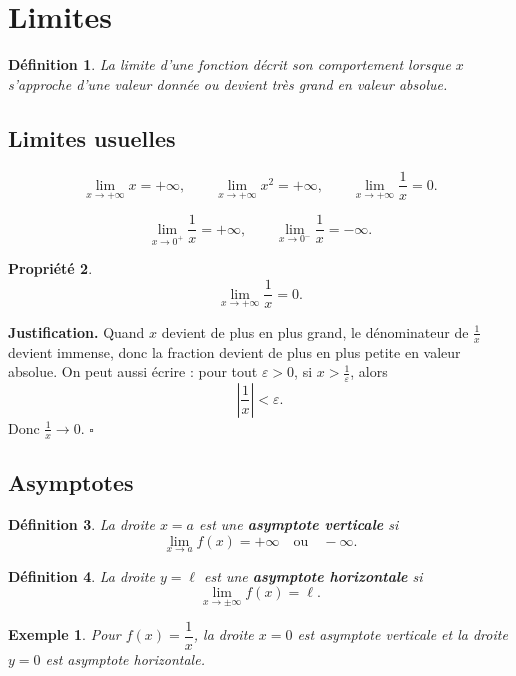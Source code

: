 \documentclass[11pt,a4paper]{article}
\newtheorem{definition}{Définition}[section]
\newtheorem{propriete}[definition]{Propriété}
\newtheorem*{exemple}{Exemple}
\begin{document}
\section{Limites}

\begin{definition}
La limite d'une fonction décrit son comportement lorsque \(x\) s'approche d'une valeur donnée ou devient très grand en valeur absolue.
\end{definition}

\subsection{Limites usuelles}

\[
\lim_{x\to +\infty}x=+\infty,\qquad
\lim_{x\to +\infty}x^2=+\infty,\qquad
\lim_{x\to +\infty}\frac1x=0.
\]

\[
\lim_{x\to 0^+}\frac1x=+\infty,\qquad
\lim_{x\to 0^-}\frac1x=-\infty.
\]

\begin{propriete}
\[
\lim_{x\to +\infty}\frac1x=0.
\]
\end{propriete}

\textbf{Justification.}  
Quand \(x\) devient de plus en plus grand, le dénominateur de \(\frac1x\) devient immense, donc la fraction devient de plus en plus petite en valeur absolue. On peut aussi écrire : pour tout \(\varepsilon>0\), si \(x>\frac1\varepsilon\), alors
\[
\left|\frac1x\right|<\varepsilon.
\]
Donc \(\frac1x\to 0\). \(\square\)

\subsection{Asymptotes}

\begin{definition}
La droite \(x=a\) est une \textbf{asymptote verticale} si
\[
\lim_{x\to a}f(x)=+\infty \quad \text{ou} \quad -\infty.
\]
\end{definition}

\begin{definition}
La droite \(y=\ell\) est une \textbf{asymptote horizontale} si
\[
\lim_{x\to \pm\infty}f(x)=\ell.
\]
\end{definition}

\begin{exemple}
Pour \(f(x)=\dfrac1x\), la droite \(x=0\) est asymptote verticale et la droite \(y=0\) est asymptote horizontale.
\end{exemple}
\end{document}
